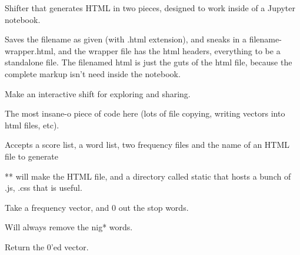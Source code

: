 \begin{fulllineitems}
\label{labMTsimple:labMTsimple.storyLab.shiftHtmlJupyter}
Shifter that generates HTML in two pieces, designed to work inside of a Jupyter notebook.

Saves the filename as given (with .html extension), and sneaks in a filename-wrapper.html, and the wrapper file has the html headers, everything to be a standalone file. The filenamed html is just the guts of the html file, because the complete markup isn't need inside the notebook.

\end{fulllineitems}


\begin{fulllineitems}
\label{labMTsimple:labMTsimple.storyLab.shiftHtmlPreshifted}
Make an interactive shift for exploring and sharing.

The most insane-o piece of code here (lots of file copying,
writing vectors into html files, etc).

Accepts a score list, a word list, two frequency files 
and the name of an HTML file to generate

** will make the HTML file, and a directory called static
that hosts a bunch of .js, .css that is useful.

\end{fulllineitems}


\begin{fulllineitems}
\label{labMTsimple:labMTsimple.storyLab.stopper}
Take a frequency vector, and 0 out the stop words.

Will always remove the nig* words.

Return the 0'ed vector.

\end{fulllineitems}

